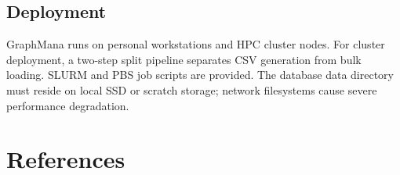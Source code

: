 \documentclass[11pt,a4paper]{article}
\begin{document}
\subsection*{Deployment}

GraphMana runs on personal workstations and HPC cluster nodes. For cluster deployment, a two-step split pipeline separates CSV generation from bulk loading. SLURM and PBS job scripts are provided. The database data directory must reside on local SSD or scratch storage; network filesystems cause severe performance degradation.


\section*{References}
\end{document}
